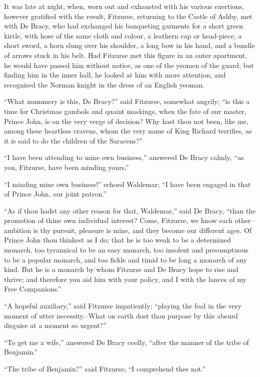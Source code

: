 It was late at night, when, worn out and exhausted with his various
exertions, however gratified with the result, Fitzurse, returning to the
Castle of Ashby, met with De Bracy, who had exchanged his banqueting
garments for a short green kirtle, with hose of the same cloth and
colour, a leathern cap or head-piece, a short sword, a horn slung over
his shoulder, a long bow in his hand, and a bundle of arrows stuck in
his belt. Had Fitzurse met this figure in an outer apartment, he would
have passed him without notice, as one of the yeomen of the guard; but
finding him in the inner hall, he looked at him with more attention, and
recognised the Norman knight in the dress of an English yeoman.

``What mummery is this, De Bracy?'' said Fitzurse, somewhat angrily;
``is this a time for Christmas gambols and quaint maskings, when the
fate of our master, Prince John, is on the very verge of decision? Why
hast thou not been, like me, among these heartless cravens, whom the
very name of King Richard terrifies, as it is said to do the children of
the Saracens?''

``I have been attending to mine own business,'' answered De Bracy
calmly, ``as you, Fitzurse, have been minding yours.''

``I minding mine own business!'' echoed Waldemar; ``I have been engaged
in that of Prince John, our joint patron.''

``As if thou hadst any other reason for that, Waldemar,'' said De Bracy,
``than the promotion of thine own individual interest? Come, Fitzurse,
we know each other--ambition is thy pursuit, pleasure is mine, and they
become our different ages. Of Prince John thou thinkest as I do; that he
is too weak to be a determined monarch, too tyrannical to be an easy
monarch, too insolent and presumptuous to be a popular monarch, and too
fickle and timid to be long a monarch of any kind. But he is a monarch
by whom Fitzurse and De Bracy hope to rise and thrive; and therefore you
aid him with your policy, and I with the lances of my Free Companions.''

``A hopeful auxiliary,'' said Fitzurse impatiently; ``playing the fool
in the very moment of utter necessity.--What on earth dost thou purpose
by this absurd disguise at a moment so urgent?''

``To get me a wife,'' answered De Bracy coolly, ``after the manner of
the tribe of Benjamin.''

``The tribe of Benjamin?'' said Fitzurse; ``I comprehend thee not.''

